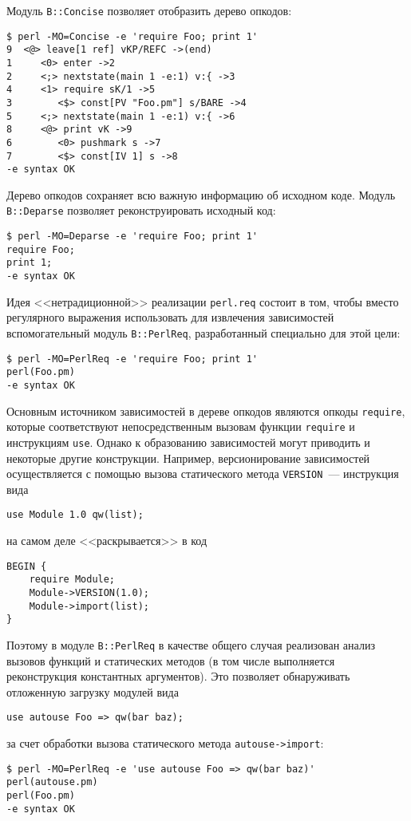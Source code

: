 \documentclass[russian,a4paper,12pt,titlepage]{article}
\begin{document}
Модуль \verb|B::Concise| позволяет отобразить дерево опкодов:
\begin{verbatim}
$ perl -MO=Concise -e 'require Foo; print 1'
9  <@> leave[1 ref] vKP/REFC ->(end)
1     <0> enter ->2
2     <;> nextstate(main 1 -e:1) v:{ ->3
4     <1> require sK/1 ->5
3        <$> const[PV "Foo.pm"] s/BARE ->4
5     <;> nextstate(main 1 -e:1) v:{ ->6
8     <@> print vK ->9
6        <0> pushmark s ->7
7        <$> const[IV 1] s ->8
-e syntax OK
\end{verbatim}

Дерево опкодов сохраняет всю важную информацию об исходном коде.
Модуль \verb|B::Deparse| позволяет реконструировать исходный код:
\begin{verbatim}
$ perl -MO=Deparse -e 'require Foo; print 1'
require Foo;
print 1;
-e syntax OK
\end{verbatim}

Идея <<нетрадиционной>> реализации \verb|perl.req| состоит в том, чтобы вместо регулярного выражения
использовать для извлечения зависимостей вспомогательный модуль \verb|B::PerlReq|, разработанный специально
для этой цели:
\begin{verbatim}
$ perl -MO=PerlReq -e 'require Foo; print 1'
perl(Foo.pm)
-e syntax OK
\end{verbatim}

Основным источником зависимостей в дереве опкодов являются опкоды \verb|require|, которые соответствуют
непосредственным вызовам функции \verb|require| и инструкциям \verb|use|.  Однако к образованию зависимостей
могут приводить и некоторые другие конструкции.  Например, версионирование зависимостей осуществляется
с помощью вызова статического метода \verb|VERSION|~--- инструкция вида
\begin{verbatim}
use Module 1.0 qw(list);
\end{verbatim}
на самом деле <<раскрывается>> в код
\begin{verbatim}
BEGIN {
    require Module;
    Module->VERSION(1.0);
    Module->import(list);
}
\end{verbatim}
Поэтому в модуле \verb|B::PerlReq| в качестве общего случая реализован анализ вызовов функций
и статических методов (в том числе выполняется реконструкция константных аргументов).  Это
позволяет обнаруживать отложенную загрузку модулей вида
\begin{verbatim}
use autouse Foo => qw(bar baz);
\end{verbatim}
за счет обработки вызова статического метода \verb|autouse->import|:
\begin{verbatim}
$ perl -MO=PerlReq -e 'use autouse Foo => qw(bar baz)'
perl(autouse.pm)
perl(Foo.pm)
-e syntax OK
\end{verbatim}
\end{document}
